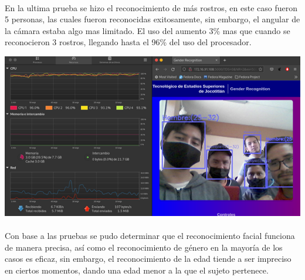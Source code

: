 \documentclass[9pt]{report}
\newenvironment{Figura}
  {\par\medskip\noindent\minipage{\linewidth}}
  {\endminipage\par\medskip}
\begin{document}
\begin{multicols}{2}
	\paragraph{}
	En la ultima prueba se hizo el reconocimiento de más rostros, en este caso fueron 5 personas, las cuales fueron reconocidas exitosamente, sin embargo, el angular de la cámara estaba algo mas limitado. El uso del aumento 3\% mas que cuando se reconocieron 3 rostros, llegando hasta el 96\% del uso del procesador.
	\begin{Figura}
		\includegraphics[width=\textwidth]{11}
		\label{figura12}
	\end{Figura}
	\paragraph{}
	Con base a las pruebas se pudo determinar que el reconocimiento facial funciona de manera precisa, así como el reconocimiento de género en la mayoría de los casos es eficaz, sin embargo, el reconocimiento de la edad tiende a ser impreciso en ciertos momentos, dando una edad menor a la que el sujeto pertenece. 

\end{multicols}
\end{document}
